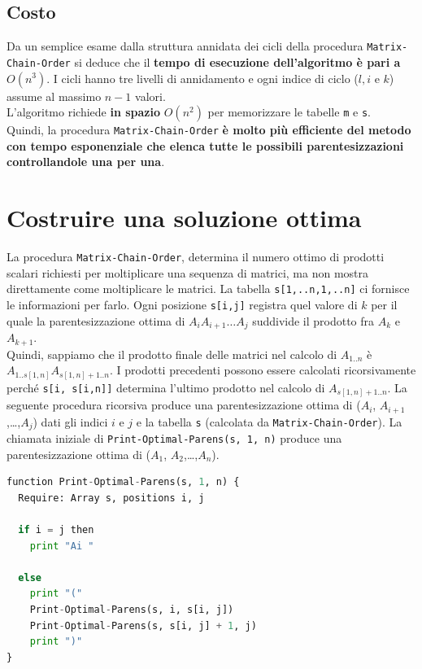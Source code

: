 \subsection{Costo}

Da un semplice esame dalla struttura annidata dei cicli della
procedura \texttt{Matrix-Chain-Order} si deduce che il \textbf{tempo
  di esecuzione dell'algoritmo è pari a} $O(n^3)$. I cicli hanno tre
livelli di annidamento e ogni indice di ciclo ($l,i \text{ e } k$)
assume al massimo $n-1$ valori.\\
L'algoritmo richiede \textbf{in spazio} $O(n^2)$ per memorizzare le
tabelle \texttt{m} e \texttt{s}.\\

Quindi, la procedura \texttt{Matrix-Chain-Order} \textbf{è molto più
  efficiente del metodo con tempo esponenziale che elenca tutte le
  possibili parentesizzazioni controllandole una per una}.


\section{Costruire una soluzione ottima}

La procedura \texttt{Matrix-Chain-Order}, determina il numero ottimo di prodotti
scalari richiesti per moltiplicare una sequenza di matrici, ma non mostra
direttamente come moltiplicare le matrici. La tabella
\texttt{s{[}1,..n,1,..n{]}} ci fornisce le informazioni per farlo. Ogni
posizione \texttt{s{[}i,j{]}} registra quel valore di $k$ per il quale la
parentesizzazione ottima di $A_i A_{i+1}\ldots A_j$ suddivide il prodotto fra
$A_k$ e $A_{k+1}$.\\

Quindi, sappiamo che il prodotto finale delle matrici nel calcolo di
$A_{1..n}$ è \linebreak $A_{1..s[1,n]} A_{s[1,n]+1..n}$. I prodotti precedenti
possono essere calcolati ricorsivamente perché
\texttt{s{[}i,\ s{[}i,n{]}{]}} determina l'ultimo prodotto nel calcolo
di $A_{s[1,n]+1..n}$. La seguente procedura ricorsiva produce una
parentesizzazione ottima di ($A_i$, $A_{i+1}$,\ldots,$A_j$) dati
gli indici $i$ e $j$ e la tabella \texttt{s} (calcolata da
\texttt{Matrix-Chain-Order}). La chiamata iniziale di
\texttt{Print-Optimal-Parens(s,\ 1,\ n)} produce una parentesizzazione
ottima di ($A_1$, $A_2$,\ldots,$A_n$).\\

\begin{lstlisting}[language=Python, mathescape=true]
function Print-Optimal-Parens(s, 1, n) {
  Require: Array s, positions i, j

  if i = j then
    print "Ai "

  else
    print "("
    Print-Optimal-Parens(s, i, s[i, j])
    Print-Optimal-Parens(s, s[i, j] + 1, j)
    print ")"
}
\end{lstlisting}
\newpage
